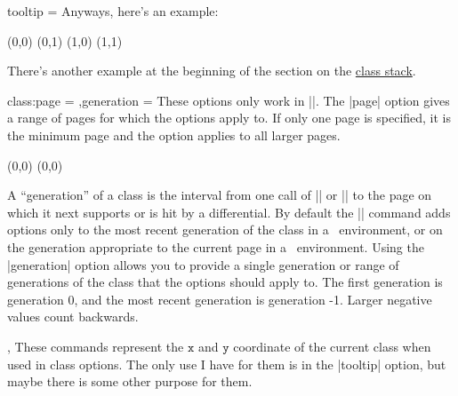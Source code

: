 \begin{sseqdata}[name = basic, cohomological Serre grading]
\begin{key}{tooltip = }
Anyways, here's an example:
\begin{codeexample}[]
\begin{sseqpage}[classes = {tooltip = {(\xcoord,\ycoord)}}]
\class(0,0)
\class(0,1)
\class(1,0)
\class(1,1)
\end{sseqpage}
\end{codeexample}

There's another example at the beginning of the section on the \hyperref[sec:class stack]{class stack}.
\end{key}

\begin{keylist}{class:page = ,generation = }
These options only work in |\classoptions|. The |page| option gives a range of pages for which the options apply to. If only one page is specified, it is the minimum page and the option applies to all larger pages.
\begin{codeexample}[width = 6cm]
\begin{sseqdata}[ name = page_example, no axes,
    title = \page, title style = {yshift = -0.5cm} ]
\class(0,0)
\classoptions[class:page = {2--3},fill,blue](0,0)
\end{sseqdata}

\printpage[ name = page_example, page = 1 ] \qquad
\printpage[ name = page_example, page = 2 ] \qquad
\printpage[ name = page_example, page = 4 ]
\end{codeexample}
A ``generation'' of a class is the interval from one call of |\class| or |\replaceclass| to the page on which it next supports or is hit by a differential.
By default the |\classoptions| command adds options only to the most recent generation of the class in a \sseqdataenv\  environment, or on the generation appropriate to the current page in a \sseqpageenv\  environment. Using the |generation| option allows you to provide a single generation or range of generations of the class that the options should apply to. The first generation is generation 0, and the most recent generation is generation -1. Larger negative values count backwards.
\codeexample[from file=class-page2a]
\codeexample[from file=class-page2b]
\end{keylist}

\begin{commandlist}{\xcoord,\ycoord}
These commands represent the $\mathtt{x}$ and $\mathtt{y}$ coordinate of the current class when used in class options. The only use I have for them is in the |tooltip| option, but maybe there is some other purpose for them.
\end{commandlist}



\end{sseqdata}
